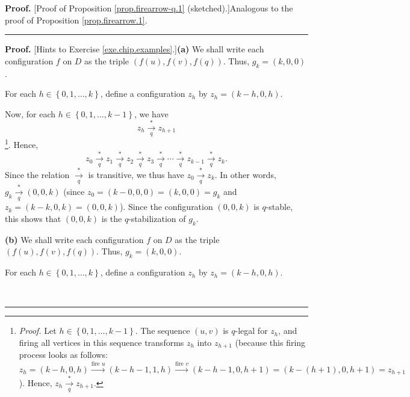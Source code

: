 \documentclass[numbers=enddot,12pt,final,onecolumn,notitlepage]{scrartcl}%
\theoremstyle{definition}
\newenvironment{proof}[1][Proof]{\noindent\textbf{#1.} }{\ \rule{0.5em}{0.5em}}
\begin{document}
\begin{proof}
[Proof of Proposition \ref{prop.firearrow-q.1} (sketched).]Analogous to the
proof of Proposition \ref{prop.firearrow.1}.
\end{proof}

\begin{proof}
[Hints to Exercise \ref{exe.chip.examples}.]\textbf{(a)} We shall write each
configuration $f$ on $D$ as the triple $\left(  f\left(  u\right)  ,f\left(
v\right)  ,f\left(  q\right)  \right)  $. Thus, $g_{k}=\left(  k,0,0\right)  $.

For each $h\in\left\{  0,1,\ldots,k\right\}  $, define a configuration $z_{h}$
by $z_{h}=\left(  k-h,0,h\right)  $.

Now, for each $h\in\left\{  0,1,\ldots,k-1\right\}  $, we have%
\[
z_{h}\underset{q}{\overset{\ast}{\rightarrow}}z_{h+1}%
\]
\footnote{\textit{Proof.} Let $h\in\left\{  0,1,\ldots,k-1\right\}  $. The
sequence $\left(  u,v\right)  $ is $q$-legal for $z_{h}$, and firing all
vertices in this sequence transforms $z_{h}$ into $z_{h+1}$ (because this
firing process looks as follows:%
\[
z_{h}=\left(  k-h,0,h\right)  \overset{\text{fire }u}{\longrightarrow}\left(
k-h-1,1,h\right)  \overset{\text{fire }v}{\longrightarrow}\left(
k-h-1,0,h+1\right)  =\left(  k-\left(  h+1\right)  ,0,h+1\right)  =z_{h+1}%
\]
). Hence, $z_{h}\underset{q}{\overset{\ast}{\rightarrow}}z_{h+1}$.}. Hence,%
\[
z_{0}\underset{q}{\overset{\ast}{\rightarrow}}z_{1}\underset{q}{\overset{\ast
}{\rightarrow}}z_{2}\underset{q}{\overset{\ast}{\rightarrow}}z_{3}%
\underset{q}{\overset{\ast}{\rightarrow}}\cdots\underset{q}{\overset{\ast
}{\rightarrow}}z_{k-1}\underset{q}{\overset{\ast}{\rightarrow}}z_{k}.
\]
Since the relation $\underset{q}{\overset{\ast}{\rightarrow}}$ is transitive,
we thus have $z_{0}\underset{q}{\overset{\ast}{\rightarrow}}z_{k}$. In other
words, $g_{k}\underset{q}{\overset{\ast}{\rightarrow}}\left(  0,0,k\right)  $
(since $z_{0}=\left(  k-0,0,0\right)  =\left(  k,0,0\right)  =g_{k}$ and
$z_{k}=\left(  k-k,0,k\right)  =\left(  0,0,k\right)  $). Since the
configuration $\left(  0,0,k\right)  $ is $q$-stable, this shows that $\left(
0,0,k\right)  $ is the $q$-stabilization of $g_{k}$.

\textbf{(b)} We shall write each configuration $f$ on $D$ as the triple
$\left(  f\left(  u\right)  ,f\left(  v\right)  ,f\left(  q\right)  \right)
$. Thus, $g_{k}=\left(  k,0,0\right)  $.

For each $h\in\left\{  0,1,\ldots,k\right\}  $, define a configuration $z_{h}$
by $z_{h}=\left(  k-h,0,h\right)  $.


\end{proof}
\end{document}
